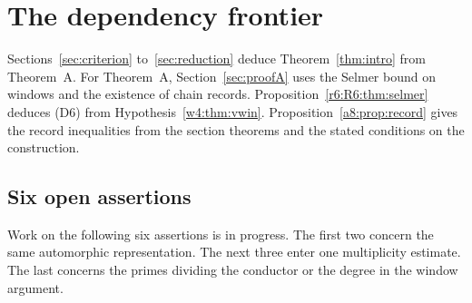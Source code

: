 \section{The dependency frontier}\label{sec:frontier}

Sections~\ref{sec:criterion}
to~\ref{sec:reduction} deduce Theorem~\ref{thm:intro} from Theorem~A.
For Theorem~A, Section~\ref{sec:proofA} uses the Selmer bound on windows
and the existence of chain records. Proposition~\ref{r6:R6:thm:selmer}
deduces (D6) from Hypothesis~\ref{w4:thm:vwin}.
Proposition~\ref{a8:prop:record} gives the record inequalities from the
section theorems and the stated conditions on the construction.

\subsection{Six open assertions}\label{fr:current}

Work on the following six assertions is in progress. The first two concern the same automorphic
representation. The next three enter one multiplicity estimate. The last
concerns the primes dividing the conductor or the degree in the window
argument.


